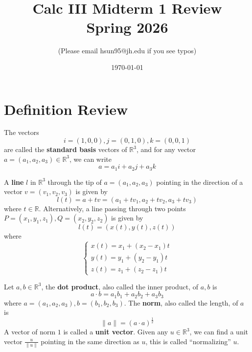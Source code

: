 \documentclass[openany]{book}
\title{Calc III Midterm 1 Review
\\ 
\vspace{0.4cm}
\large Spring 2026}
\author{(Please email hsun95@jh.edu if you see typos)}
\date{\today}
\newcommand{\R}{\mathbb{R}}
\begin{document}
\maketitle

\tableofcontents
\newpage


\chapter{Definition Review}


\begin{defn}[standard basis in $\R^3$]
    The vectors 
    \begin{equation*}
        i=(1,0,0), j=(0,1,0), k=(0,0,1)
    \end{equation*}
    are called the \textbf{standard basis} vectors of $\R^3$, and for any vector $a=(a_1,a_2,a_3)\in\R^3$, we can write 
    \begin{equation*}
        a=a_1i+a_2j+a_3k
    \end{equation*}
\end{defn}




\begin{defn}\label{line}
    A \textbf{line} $l$ in $\R^3$ through the tip of $a=(a_1,a_2,a_3)$ pointing in the direction of a vector $v=(v_1,v_2,v_3)$ is given by 
    \begin{equation*}
        l(t)=a+tv=(a_1+tv_1, a_2+tv_2, a_3+tv_3)
    \end{equation*}
    where $t\in\R$. Alternatively, a line passing through two points $P=(x_1,y_1,z_1), Q=(x_2,y_2,z_2)$ is given by 
    \begin{equation*}
        l(t)=(x(t), y(t), z(t))
    \end{equation*}
    where 
    \begin{equation*}
        \begin{cases}
            x(t)=x_1+(x_2-x_1)t\\
            y(t)=y_1+(y_2-y_1)t\\
            z(t)=z_1+(z_2-z_1)t
        \end{cases}
    \end{equation*}
\end{defn}



\begin{defn}
    Let $a,b\in\R^3$, the \textbf{dot product}, also called the inner product, of $a,b$ is 
    \begin{equation*}
        a\cdot b=a_1b_1+a_2b_2+a_3b_3
    \end{equation*}
    where $a=(a_1,a_2,a_3), b=(b_1,b_2,b_3)$. The \textbf{norm}, also called the length, of $a$ is 
    \begin{equation*}
        \|a\|=(a\cdot a)^\frac{1}{2}
    \end{equation*}
    A vector of norm $1$ is called a \textbf{unit vector}. Given any $u\in\R^3$, we can find a unit vector $\frac{u}{\|u\|}$ pointing in the same direction as $u$, this is called ``normalizing'' $u$.
\end{defn}
\end{document}
